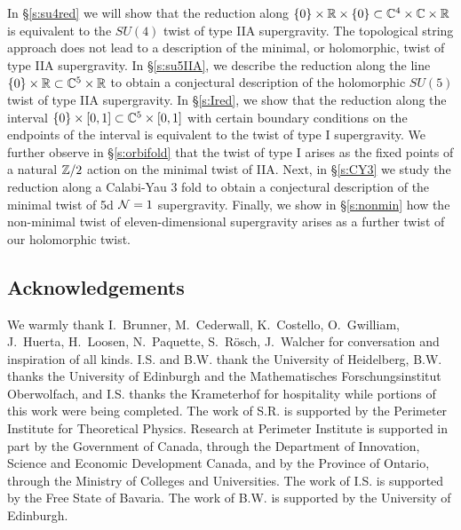 In \S\ref{s:su4red} we will show that the reduction along $\{0\} \times \mathbb R \times \{0\} \subset \mathbb C^4 \times \mathbb C \times \mathbb R$ is equivalent to the $SU(4)$ twist of type IIA supergravity. 
The topological string approach does not lead to a description of the minimal, or holomorphic, twist of type IIA supergravity. 
In \S \ref{s:su5IIA}, we describe the reduction along the line $\{0\} \times \mathbb R \subset \mathbb C^5 \times \mathbb R$ to obtain a conjectural description of the holomorphic $SU(5)$ twist of type IIA supergravity. 
In \S \ref{s:Ired}, we show that the reduction along the interval $\{0\}\times [0,1]\subset \mathbb C^5\times [0,1]$ with certain boundary conditions on the endpoints of the interval is equivalent to the twist of type I supergravity. We further observe in \S \ref{s:orbifold} that the twist of type I arises as the fixed points of a natural $\mathbb Z/2$ action on the minimal twist of IIA. Next, in \S \ref{s:CY3} we study the reduction along a Calabi-Yau 3 fold to obtain a conjectural description of the minimal twist of 5d $\mathcal N=1$ supergravity. Finally, we show in \S \ref{s:nonmin} how the non-minimal twist of eleven-dimensional supergravity arises as a further twist of our holomorphic twist.



\subsection*{Acknowledgements}
We warmly thank I.~Brunner, M.~Cederwall, K.~Costello, O.~Gwil\-liam, J.~Huerta, H.~Loosen, N.~Paquette, S.~R\"osch, J.~Walcher for conversation and inspiration of all kinds. I.S. and B.W. thank the University of Heidelberg, B.W. thanks the University of Edinburgh and the Mathematisches Forschungsinstitut Oberwolfach, and I.S. thanks the Krameterhof for hospitality while portions of this work were being completed. The work of S.R. is supported by the Perimeter Institute for Theoretical Physics. Research at Perimeter Institute is supported in part by the Government of Canada, through the Department of Innovation, Science and Economic Development Canada, and by the Province of Ontario, through the Ministry of Colleges and Universities.
The work of I.S. is supported by the Free State of Bavaria. The work of B.W. is supported by the University of Edinburgh.


%
